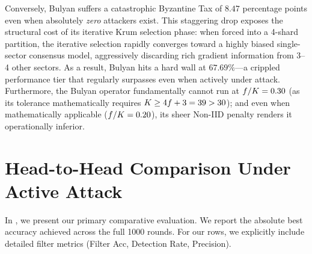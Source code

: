 \documentclass[../main.tex]{subfiles}
\begin{document}
Conversely, Bulyan suffers a catastrophic Byzantine Tax of $8.47$ percentage points even when absolutely \emph{zero} attackers exist. This staggering drop exposes the structural cost of its iterative Krum selection phase: when forced into a 4-shard partition, the iterative selection rapidly converges toward a highly biased single-sector consensus model, aggressively discarding rich gradient information from 3--4 other sectors. As a result, Bulyan hits a hard wall at $67.69\%$---a crippled performance tier that \aegis{} regularly surpasses even when actively under attack. Furthermore, the Bulyan operator fundamentally cannot run at $f/K=0.30$ (as its tolerance mathematically requires $K \geq 4f+3 = 39 > 30$); and even when mathematically applicable ($f/K=0.20$), its sheer Non-IID penalty renders it operationally inferior.

\section{Head-to-Head Comparison Under Active Attack}
\label{sec:results_main}

In , we present our primary comparative evaluation. We report the absolute best accuracy achieved across the full 1000 rounds. For our \aegis{} rows, we explicitly include detailed filter metrics (Filter Acc, Detection Rate, Precision).
\end{document}
